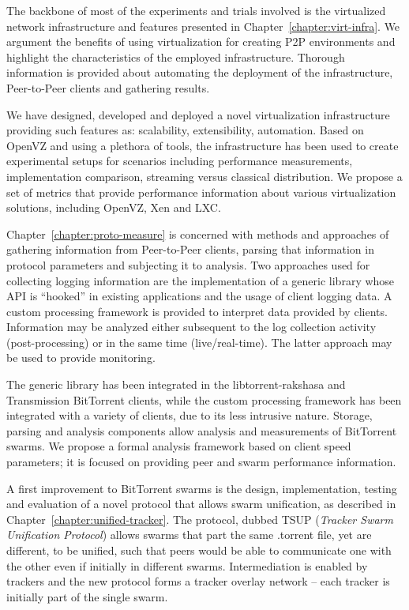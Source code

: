 The backbone of most of the experiments and trials involved is the
virtualized network infrastructure and features presented in
Chapter~\ref{chapter:virt-infra}. We argument the benefits of using
virtualization for creating P2P environments and highlight the characteristics
of the employed infrastructure. Thorough information is provided about
automating the deployment of the infrastructure, Peer-to-Peer clients and
gathering results.

We have designed, developed and deployed a novel virtualization infrastructure
providing such features as: scalability, extensibility, automation. Based on
OpenVZ and using a plethora of tools, the infrastructure has been used to
create experimental setups for scenarios including performance measurements,
implementation comparison, streaming versus classical distribution. We propose
a set of metrics that provide performance information about various
virtualization solutions, including OpenVZ, Xen and LXC.

Chapter~\ref{chapter:proto-measure} is concerned with methods and approaches
of gathering information from Peer-to-Peer clients, parsing that information
in protocol parameters and subjecting it to analysis. Two approaches used for
collecting logging information are the implementation of a generic library
whose API is ``hooked'' in existing applications and the usage of client
logging data. A custom processing framework is provided to interpret data
provided by clients. Information may be analyzed either subsequent to the log
collection activity (post-processing) or in the same time (live/real-time).
The latter approach may be used to provide monitoring.

The generic library has been integrated in the libtorrent-rakshasa and
Transmission BitTorrent clients, while the custom processing framework has
been integrated with a variety of clients, due to its less intrusive nature.
Storage, parsing and analysis components allow analysis and measurements of
BitTorrent swarms. We propose a formal analysis framework based on client
speed parameters; it is focused on providing peer and swarm performance
information.

A first improvement to BitTorrent swarms is the design, implementation,
testing and evaluation of a novel protocol that allows swarm unification, as
described in Chapter~\ref{chapter:unified-tracker}. The protocol, dubbed TSUP
(\textit{Tracker Swarm Unification Protocol}) allows swarms that part the same
.torrent file, yet are different, to be unified, such that peers would be able
to communicate one with the other even if initially in different swarms.
Intermediation is enabled by trackers and the new protocol forms a tracker
overlay network -- each tracker is initially part of the single swarm.

